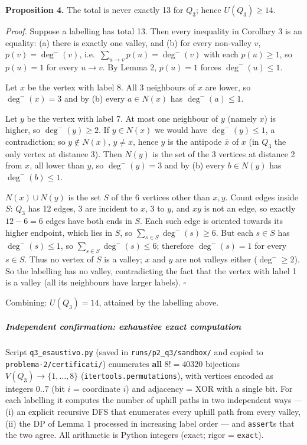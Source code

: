 \documentclass[11pt,a4paper]{article}
\begin{document}
\textbf{Proposition 4.} The total is never exactly 13 for \(Q_3\); hence
\(U(Q_3)\ge 14\).

\emph{Proof.} Suppose a labelling has total 13. Then every inequality in
Corollary 3 is an equality: (a) there is exactly one valley, and (b) for
every non-valley \(v\), \(p(v)=\deg^-(v)\),
i.e.~\(\sum_{u\to v}p(u)=\deg^-(v)\) with each \(p(u)\ge1\), so
\(p(u)=1\) for every \(u\to v\). By Lemma 2, \(p(u)=1\) forces
\(\deg^-(u)\le1\).

Let \(x\) be the vertex with label 8. All 3 neighbours of \(x\) are
lower, so \(\deg^-(x)=3\) and by (b) every \(a\in N(x)\) has
\(\deg^-(a)\le1\).

Let \(y\) be the vertex with label 7. At most one neighbour of \(y\)
(namely \(x\)) is higher, so \(\deg^-(y)\ge2\). If \(y\in N(x)\) we
would have \(\deg^-(y)\le1\), a contradiction; so \(y\notin N(x)\),
\(y\ne x\), hence \(y\) is the antipode \(\bar x\) of \(x\) (in \(Q_3\)
the only vertex at distance 3). Then \(N(y)\) is the set of the 3
vertices at distance 2 from \(x\), all lower than \(y\), so
\(\deg^-(y)=3\) and by (b) every \(b\in N(y)\) has \(\deg^-(b)\le1\).

\(N(x)\cup N(y)\) is the set \(S\) of the 6 vertices other than \(x,y\).
Count edges inside \(S\): \(Q_3\) has 12 edges, 3 are incident to \(x\),
3 to \(y\), and \(xy\) is not an edge, so exactly \(12-6=6\) edges have
both ends in \(S\). Each such edge is oriented towards its higher
endpoint, which lies in \(S\), so \(\sum_{s\in S}\deg^-(s)\ge 6\). But
each \(s\in S\) has \(\deg^-(s)\le1\), so
\(\sum_{s\in S}\deg^-(s)\le6\); therefore \(\deg^-(s)=1\) for every
\(s\in S\). Thus no vertex of \(S\) is a valley; \(x\) and \(y\) are not
valleys either (\(\deg^-\ge2\)). So the labelling has no valley,
contradicting the fact that the vertex with label 1 is a valley (all its
neighbours have larger labels). \(\square\)

Combining: \(U(Q_3)=14\), attained by the labelling above.

\subparagraph{Independent confirmation: exhaustive exact
computation}\label{independent-confirmation-exhaustive-exact-computation}

Script \texttt{q3\_esaustivo.py} (saved in \texttt{runs/p2\_q3/sandbox/}
and copied to \texttt{problema-2/certificati/}) enumerates \textbf{all}
\(8!=40320\) bijections \(V(Q_3)\to\{1,\dots,8\}\)
(\texttt{itertools.permutations}), with vertices encoded as integers
\(0..7\) (bit \(i\) = coordinate \(i\)) and adjacency = XOR with a
single bit. For each labelling it computes the number of uphill paths in
two independent ways --- (i) an explicit recursive DFS that enumerates
every uphill path from every valley, (ii) the DP of Lemma 1 processed in
increasing label order --- and \texttt{assert}s that the two agree. All
arithmetic is Python integers (exact; rigor = \texttt{exact}).
\end{document}
